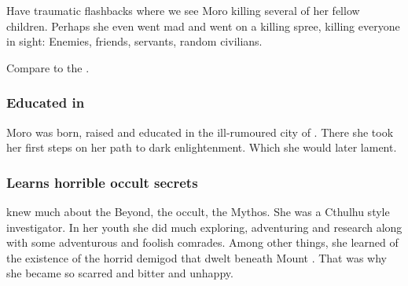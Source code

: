 Have traumatic flashbacks where we see Moro killing several of her fellow children. 
Perhaps she even went mad and went on a killing spree, killing everyone in sight: 
Enemies, friends, servants, random civilians. 

Compare to the \cite{Anime:ElfenLied}.






\subsubsection{Educated in \Yormis}
Moro was born, raised and educated in the ill-rumoured city of . 
There she took her first steps on her path to dark enlightenment.
Which she would later lament.





\subsubsection{Learns horrible occult secrets}
\MoroCobrel knew much about the Beyond, the occult, the \Miith Mythos. 
She was a Cthulhu style investigator. 
In her youth she did much exploring, adventuring and research along with some adventurous and foolish comrades. 
Among other things, she learned of the existence of the horrid demigod  that dwelt beneath Mount \Shrun. 
That was why she became so scarred and bitter and unhappy. 

